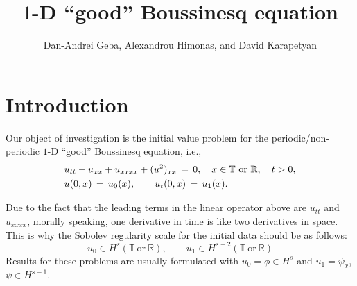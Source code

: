 \documentclass[12pt,reqno]{amsart}
\numberwithin{equation}{section}  %
\numberwithin{figure}{section}
\theoremstyle{plain}
\theoremstyle{definition}
\theoremstyle{remark}
\begin{document}
\title{$1$-D ``good'' Boussinesq equation}

\author{Dan-Andrei Geba, Alexandrou Himonas, and David Karapetyan}

\address{Department of Mathematics, University of Rochester, Rochester, NY 14627}
\address{Department of Mathematics, University of Notre Dame, Notre Dame, IN 46556}
\address{Department of Mathematics, University of Notre Dame, Notre Dame, IN 46556}
\date{}



\maketitle
%
\section{Introduction}
Our object of investigation is the initial value problem for the
periodic/non-periodic $1$-D ``good'' Boussinesq equation, i.e.,
\begin{equation}
  \aligned
  & u_{tt}-u_{xx}+u_{xxxx}+ (u^2)_{xx}\,=\,0, \quad x\in \mathbb{T}\ \text{or} \ \mathbb{R}, \quad t>0,\\
&u(0,x)\,=\,u_0(x),\qquad u_t(0,x)\,=\,u_1(x).\endaligned
\label{main}
\end{equation}

Due to the fact that the leading terms in the linear operator above are $u_{tt}$ and $u_{xxxx}$, morally speaking, one derivative in time is like two derivatives in space. This is why the Sobolev regularity scale for the initial data should be as follows:
\[
u_0\in H^s(\mathbb{T}\ \text{or} \ \mathbb{R}), \qquad u_1\in H^{s-2}(\mathbb{T}\ \text{or} \ \mathbb{R})
\]
Results for these problems are usually formulated with $u_0=\phi \in H^s$ and $u_1=\psi_x$, $\psi\in H^{s-1}$.
\end{document}
